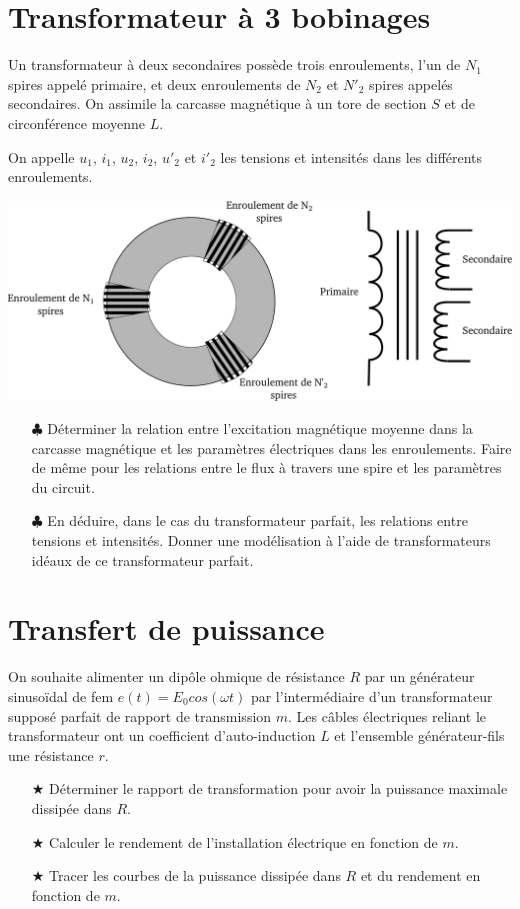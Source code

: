 \documentclass{report}
\begin{document}
\newpage

\section*{Transformateur à 3 bobinages}

Un transformateur à deux secondaires  possède trois enroulements, l'un de $N_{1}$ spires appelé primaire, et deux enroulements de $N_{2}$ et $N'_{2}$ spires appelés secondaires. On assimile la carcasse magnétique à un tore de section $S$ et de circonférence moyenne $L$.

On appelle $u_{1}$, $i_{1}$, $u_{2}$, $i_{2}$, $u'_{2}$ et $i'_{2}$ les tensions et intensités dans les différents enroulements.
\begin{center}
	\includegraphics[scale=0.3]{transfo_3.pdf}
\end{center}

\begin{itemize}
	\item[$\clubsuit$] Déterminer la relation entre l'excitation magnétique moyenne dans la carcasse magnétique et les paramètres électriques dans les enroulements. Faire de même pour les relations entre le flux à travers une spire et les paramètres du circuit.
	
	\item[$\clubsuit$] En déduire, dans le cas du transformateur parfait, les relations entre tensions et intensités. Donner une modélisation à l'aide de transformateurs idéaux de ce transformateur parfait.	
\end{itemize}

\section*{Transfert de puissance}

On souhaite alimenter un dipôle ohmique de résistance $R$ par un générateur sinusoïdal de fem $e(t) = E_{0} cos(\omega t)$ par l'intermédiaire d'un transformateur supposé parfait de rapport de transmission $m$. Les câbles électriques reliant le transformateur ont un coefficient d'auto-induction $L$ et l'ensemble générateur-fils une résistance $r$.

\begin{itemize}
	\item[$\bigstar$] Déterminer le rapport de transformation pour avoir la puissance maximale dissipée dans $R$.
	\item[$\bigstar$] Calculer le rendement de l'installation électrique en fonction de $m$.
	\item[$\bigstar$] Tracer les courbes de la puissance dissipée dans $R$ et du rendement en fonction de $m$.
\end{itemize}
\end{document}
